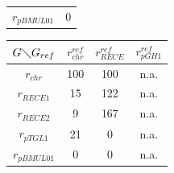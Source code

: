 \begin{table}[H]
\begin{center}
\begin{minipage}[t]{0.3\textwidth}
\begin{tabular}{c|c}
			$r_{pBMUL01}$ & 0\\
	\end{tabular}
	\label{tablesyntburk3}
	\end{minipage}
	\begin{minipage}[t]{0.6\textwidth}
		\begin{tabular}{c|ccc}
			$G \diagdown G_{ref}$ & $r^{ref}_{chr}$ & $r^{ref}_{RECE}$ & $r^{ref}_{pGH1}$\\
			\hline
			$r_{chr}$ & 100 & 100 & n.a.\\
			$ r_{RECE 1}$ & 15 & 122 & n.a.\\
			$r_{RECE 2}$ & 9 & 167 & n.a.\\
			$r_{pTGL1}$ & 21 & 0 & n.a.\\
			$r_{pBMUL01}$ & 0 & 0 & n.a.\\
	\end{tabular}
	\label{tablesyntburk4}
	\end{minipage}
\end{center}
\end{table}

